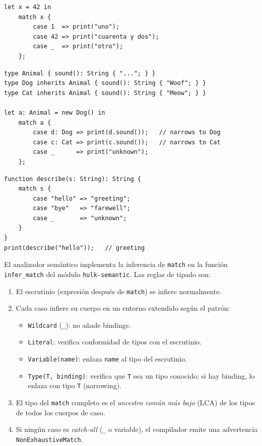 \documentclass[12pt, a4paper]{article}
\begin{document}
\begin{lstlisting}[caption={Patrones literales}, label=lst:match-lit]
let x = 42 in
    match x {
        case 1  => print("uno");
        case 42 => print("cuarenta y dos");
        case _  => print("otro");
    };
\end{lstlisting}

\begin{lstlisting}[caption={Patrones de tipo con jerarquía de herencia},
                   label=lst:match-type]
type Animal { sound(): String { "..."; } }
type Dog inherits Animal { sound(): String { "Woof"; } }
type Cat inherits Animal { sound(): String { "Meow"; } }

let a: Animal = new Dog() in
    match a {
        case d: Dog => print(d.sound());   // narrows to Dog
        case c: Cat => print(c.sound());   // narrows to Cat
        case _      => print("unknown");
    };
\end{lstlisting}

\begin{lstlisting}[caption={match como expresión -- el resultado se asigna},
                   label=lst:match-expr]
function describe(s: String): String {
    match s {
        case "hello" => "greeting";
        case "bye"   => "farewell";
        case _       => "unknown";
    }
}
print(describe("hello"));   // greeting
\end{lstlisting}

El analizador semántico implementa la inferencia de \texttt{match} en la función
\texttt{infer\_match} del módulo \texttt{hulk-semantic}. Las reglas de tipado son:

\begin{enumerate}[leftmargin=*, label=\arabic*.]
    \item El escrutinio (expresión después de \texttt{match}) se infiere normalmente.
    \item Cada caso infiere su cuerpo en un entorno extendido según el patrón:
    \begin{itemize}
        \item \texttt{Wildcard} (\texttt{\_}): no añade bindings.
        \item \texttt{Literal}: verifica conformidad de tipos con el escrutinio.
        \item \texttt{Variable(name)}: enlaza \texttt{name} al tipo del escrutinio.
        \item \texttt{Type(T, binding)}: verifica que \texttt{T} sea un tipo
              conocido; si hay binding, lo enlaza con tipo \texttt{T} (narrowing).
    \end{itemize}
    \item El tipo del \texttt{match} completo es el \textit{ancestro común más
          bajo} (LCA) de los tipos de todos los cuerpos de caso.
    \item Si ningún caso es \textit{catch-all} (\texttt{\_} o variable), el
          compilador emite una advertencia \texttt{NonExhaustiveMatch}.
\end{enumerate}
\end{document}
